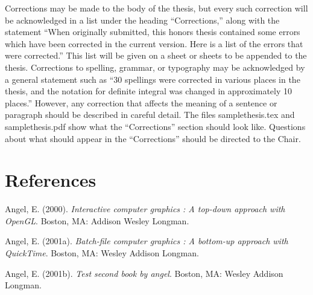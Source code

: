 \documentclass[12pt, twoside]{amherstthesis}
\newenvironment{CSLReferences}[2]%
  {}%
  {\par}
\begin{document}
Corrections may be made to the body of the thesis, but every such correction will be acknowledged in a list under the heading ``Corrections,'' along with the statement ``When originally submitted, this honors thesis contained some errors which have been corrected in the current version. Here is a list of the errors that were corrected.'' This list will be given on a sheet or sheets to be appended to the thesis. Corrections to spelling, grammar, or typography may be acknowledged by a general statement such as ``30 spellings were corrected in various places in the thesis, and the notation for definite integral was changed in approximately 10 places.'' However, any correction that affects the meaning of a sentence or paragraph should be described in careful detail. The files samplethesis.tex and samplethesis.pdf show what the ``Corrections'' section should look like. Questions about what should appear in the ``Corrections'' should be directed to the Chair.

\backmatter

\hypertarget{references}{%
\chapter*{References}\label{references}}

\noindent

\setlength{\parindent}{-0.20in}
\setlength{\leftskip}{0.20in}
\setlength{\parskip}{8pt}

\hypertarget{refs}{}
\begin{CSLReferences}{1}{0}
\leavevmode{}%
Angel, E. (2000). \emph{Interactive computer graphics : A top-down approach with OpenGL}. Boston, MA: Addison Wesley Longman.

\leavevmode{}%
Angel, E. (2001a). \emph{Batch-file computer graphics : A bottom-up approach with QuickTime}. Boston, MA: Wesley Addison Longman.

\leavevmode{}%
Angel, E. (2001b). \emph{Test second book by angel}. Boston, MA: Wesley Addison Longman.

\end{CSLReferences}
\end{document}
